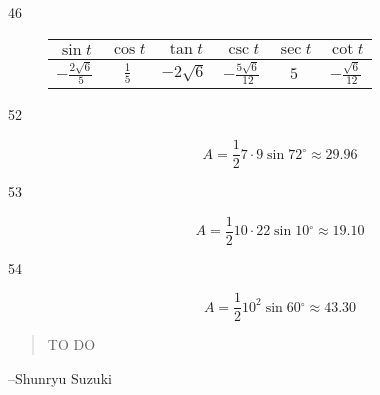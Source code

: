 \documentclass{exam}
\newcommand{\dg}{\ensuremath{^\circ}}
\begin{document}
\begin{description}
      \item[46]
        \begin{tabular}[H]{cccccc}
          \toprule
          $\sin t$                & $\cos t$      & $\tan t$      & $\csc t$                 & $\sec t$ & $\cot t$ \\
          \midrule
          $-\frac{2 \sqrt{6}}{5}$ & $\frac{1}{5}$ & $-2 \sqrt{6}$ & $-\frac{5 \sqrt{6}}{12}$ & $5$      & $-\frac{\sqrt{6}}{12}$ \\
          \bottomrule
        \end{tabular}

      \item[52]
        \[
          A = \frac{1}{2} 7 \cdot 9 \sin 72 \dg \approx \boxed{ 29.96 }
        \]

      \item[53]
        \[
          A = \frac{1}{2} 10 \cdot 22 \sin 10 \dg \approx \boxed{ 19.10 }
        \]

      \item[54]
        \[
          A = \frac{1}{2} 10^2 \sin 60 \dg \approx \boxed{ 43.30 }
        \]


    \end{description}

  \else
    \vspace{1 cm}
    \begin{quote}
      \begin{em}
        TO DO
      \end{em}
    \end{quote}
    \hspace{1 cm} --Shunryu Suzuki
  \fi
\end{document}
